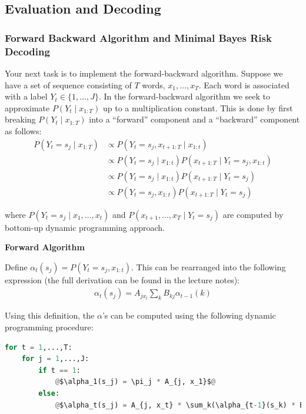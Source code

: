 \documentclass[11pt,addpoints,answers]{exam}
\begin{document}
\newpage

\subsection{Evaluation and Decoding}
\label{forback}

\subsubsection{Forward Backward Algorithm and Minimal Bayes Risk Decoding}

Your next task is to implement the forward-backward algorithm. Suppose we have a set of sequence consisting of $T$ words, $x_1,\dots,x_T$. Each word is associated with a label $Y_t\in\{1,\dots,J\}$. In the forward-backward algorithm we seek to approximate $P(Y_t \mid x_{1:T})$ up to a multiplication constant. This is done by first breaking $P(Y_t \mid x_{1:T})$ into a ``forward'' component and a ``backward'' component as follows:
\begin{align*}
   P(Y_t =s_j \mid x_{1:T}) &\propto P(Y_t=s_j,x_{t+1:T} \mid x_{1:t})\\
   &\propto P(Y_t=s_j \mid x_{1:t})P(x_{t+1:T} \mid Y_t=s_j, x_{1:t})\\
    &\propto P(Y_t=s_j \mid x_{1:t})P(x_{t+1:T} \mid Y_t=s_j)\\ 
     &\propto P(Y_t=s_j, x_{1:t})P(x_{t+1:T} \mid Y_t=s_j) 
\end{align*}



where $P(Y_t=s_j \mid x_1,\dots,x_{t})$ and $P(x_{t+1},\dots,x_T \mid Y_t=s_j)$ are computed by bottom-up dynamic programming approach.

\vspace{0.4 in}
\textbf{Forward Algorithm}



Define $\alpha_t(s_j) = P(Y_t = s_j, x_{1:t})$. This can be rearranged into the following expression (the full derivation can be found in the lecture notes):
\begin{align}
    \label{eqn:alpha}
    \alpha_t(s_j) = A_{jx_t} \sum_{k} B_{kj} \alpha_{t-1}(k)
\end{align}

Using this definition, the $\alpha$'s can be computed using the following dynamic programming procedure:

\begin{lstlisting}[language=Python,escapechar=@]
for t = 1,...,T:
    for j = 1,...,J:
        if t == 1:
            @$\alpha_1(s_j) = \pi_j * A_{j, x_1}$@
        else:
            @$\alpha_t(s_j) = A_{j, x_t} * \sum_k(\alpha_{t-1}(s_k) * B_{k, j})$@
\end{lstlisting}
\end{document}
